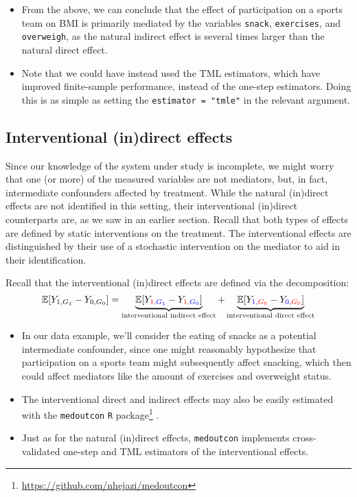 \documentclass[
  12pt,
]{book}
\newcommand{\passthrough}[1]{#1}
\providecommand{\tightlist}{%
  \setlength{\itemsep}{0pt}\setlength{\parskip}{0pt}}
\renewcommand{\href}[2]{#2\footnote{\url{#1}}}
\theoremstyle{definition}
\theoremstyle{definition}
\theoremstyle{definition}
\newcommand{\E}{\mathbb{E}}
\newcommand{\1}{\mathbbm{1}}
\begin{document}
\begin{itemize}
\tightlist
\item
  From the above, we can conclude that the effect of participation on a sports
  team on BMI is primarily mediated by the variables \passthrough{\lstinline!snack!}, \passthrough{\lstinline!exercises!}, and
  \passthrough{\lstinline!overweigh!}, as the natural indirect effect is several times larger than the
  natural direct effect.
\item
  Note that we could have instead used the TML estimators, which have improved
  finite-sample performance, instead of the one-step estimators. Doing this is
  as simple as setting the \passthrough{\lstinline!estimator = "tmle"!} in the relevant argument.
\end{itemize}

\hypertarget{interventional-indirect-effects-1}{%
\subsection{Interventional (in)direct effects}\label{interventional-indirect-effects-1}}

Since our knowledge of the system under study is incomplete, we might worry that
one (or more) of the measured variables are not mediators, but, in fact,
intermediate confounders affected by treatment. While the natural (in)direct
effects are not identified in this setting, their interventional (in)direct
counterparts are, as we saw in an earlier section. Recall that both types of
effects are defined by static interventions on the treatment. The interventional
effects are distinguished by their use of a stochastic intervention on the
mediator to aid in their identification.

Recall that the interventional (in)direct effects are defined via the decomposition:
\begin{equation*}
\E[Y_{1,G_1} - Y_{0,G_0}] = \underbrace{\E[Y_{\color{red}{1},\color{blue}{G_1}} -
    Y_{\color{red}{1},\color{blue}{G_0}}]}_{\text{interventional indirect effect}} +
    \underbrace{\E[Y_{\color{blue}{1},\color{red}{G_0}} -
    Y_{\color{blue}{0},\color{red}{G_0}}]}_{\text{interventional direct effect}}
\end{equation*}

\begin{itemize}
\tightlist
\item
  In our data example, we'll consider the eating of snacks as a potential
  intermediate confounder, since one might reasonably hypothesize that
  participation on a sports team might subsequently affect snacking, which then
  could affect mediators like the amount of exercises and overweight status.
\item
  The interventional direct and indirect effects may also be easily estimated
  with the \href{https://github.com/nhejazi/medoutcon}{\passthrough{\lstinline!medoutcon!} \passthrough{\lstinline!R!} package}
  \citep{hejazi2021medoutcon}.
\item
  Just as for the natural (in)direct effects, \passthrough{\lstinline!medoutcon!} implements
  cross-validated one-step and TML estimators of the interventional effects.
\end{itemize}
\end{document}
